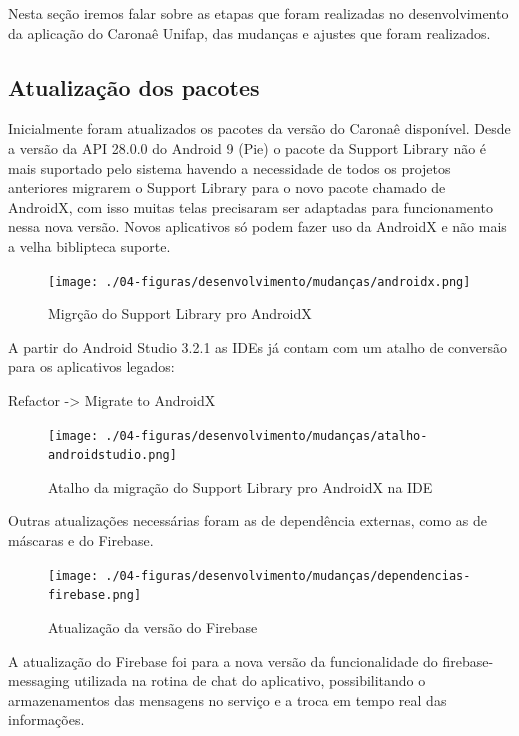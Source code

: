 Nesta seção iremos falar sobre as etapas que foram realizadas no desenvolvimento da aplicação do Caronaê Unifap, das mudanças e ajustes que foram realizados.

\subsection{Atualização dos pacotes}
Inicialmente foram atualizados os pacotes da versão do Caronaê disponível. Desde a versão da API 28.0.0 do Android 9 (Pie) o pacote da Support Library não é mais suportado pelo sistema havendo a necessidade de todos os projetos anteriores migrarem o Support Library para o novo pacote chamado de AndroidX, com isso muitas telas precisaram ser adaptadas para funcionamento nessa nova versão. Novos aplicativos só podem fazer uso da AndroidX e não mais a velha biblipteca suporte.

\begin{figure}[!hbtp]
	\centering
	\caption{Migrção do Support Library pro AndroidX}
	\texttt{[image: ./04-figuras/desenvolvimento/mudanças/androidx.png]}
	\label{fig:1}
\end{figure}
	
A partir do Android Studio 3.2.1 as IDEs já contam com um atalho de conversão para os aplicativos legados:

Refactor -> Migrate to AndroidX

\begin{figure}[!hbtp]
	\centering
	\caption{Atalho da migração do Support Library pro AndroidX na IDE}
	\texttt{[image: ./04-figuras/desenvolvimento/mudanças/atalho-androidstudio.png]}
	\label{fig:2}
\end{figure}

Outras atualizações necessárias foram as de dependência externas, como as de máscaras e do Firebase.

\begin{figure}[!hbtp]
	\centering
	\caption{Atualização da versão do Firebase}
	\texttt{[image: ./04-figuras/desenvolvimento/mudanças/dependencias-firebase.png]}
	\label{fig:7}
\end{figure}

A atualização do Firebase foi para a nova versão da funcionalidade do firebase-messaging utilizada na rotina de chat do aplicativo, possibilitando o armazenamentos das mensagens no serviço e a troca em tempo real das informações.

